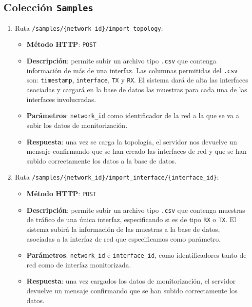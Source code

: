\documentclass[a4paper, oneside, 12pt]{book}
\begin{document}
	\subsection{Colección \texttt{Samples}}
	
	\begin{enumerate}
		\item Ruta \texttt{/samples/\{network\_id\}/import\_topology}:
		
		\begin{itemize}
			\item \textbf{Método HTTP}: \texttt{POST}
			\item \textbf{Descripción}: permite subir un archivo tipo \texttt{.csv} que contenga información de más de una interfaz. Las columnas permitidas del \texttt{.csv} son: \texttt{timestamp}, \texttt{interface}, \texttt{TX} y \texttt{RX}. El sistema dará de alta las interfaces asociadas y cargará en la base de datos las muestras para cada una de las interfaces involucradas.
			\item \textbf{Parámetros}: \texttt{network\_id} como identificador de la red a la que se va a subir los datos de monitorización.
			\item \textbf{Respuesta}: una vez se carga la topología, el servidor nos devuelve un mensaje confirmando que se han creado las interfaces de red y que se han subido correctamente los datos a la base de datos.
		\end{itemize}
	
		\item Ruta \texttt{/samples/\{network\_id\}/import\_interface/\{interface\_id\}}:
		
		\begin{itemize}
			\item \textbf{Método HTTP}: \texttt{POST}
			\item \textbf{Descripción}: permite subir un archivo tipo \texttt{.csv} que contenga muestras de tráfico de una única interfaz, especificando si es de tipo \texttt{RX} o \texttt{TX}. El sistema subirá la información de las muestras a la base de datos, asociadas a la interfaz de red que especificamos como parámetro.
			\item \textbf{Parámetros}: \texttt{network\_id} e \texttt{interface\_id}, como identificadores tanto de red como de interfaz monitorizada.
			\item \textbf{Respuesta}: una vez cargados los datos de monitorización, el servidor devuelve un mensaje confirmando que se han subido correctamente los datos.
		\end{itemize}
	\end{enumerate}
	
\end{document}
